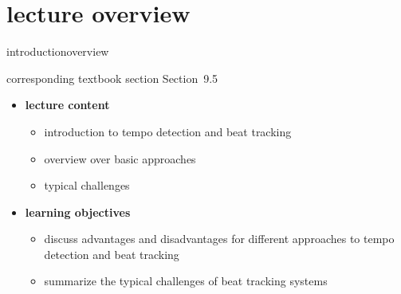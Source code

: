 


\subtitle{Module 9.5: Tempo Detection}


	

    \section[overview]{lecture overview}
        \begin{frame}{introduction}{overview}
            \begin{block}{corresponding textbook section}
                    Section~9.5
            \end{block}

            \begin{itemize}
                \item   \textbf{lecture content}
                    \begin{itemize}
                        \item   introduction to tempo detection and beat tracking
                        \item   overview over basic approaches
                        \item    typical challenges
                    \end{itemize}
                \bigskip
                \item<2->   \textbf{learning objectives}
                    \begin{itemize}
                        \item   discuss advantages and disadvantages for different approaches to tempo detection and beat tracking
                        \item   summarize the typical challenges of beat tracking systems
                    \end{itemize}
            \end{itemize}
        \end{frame}

